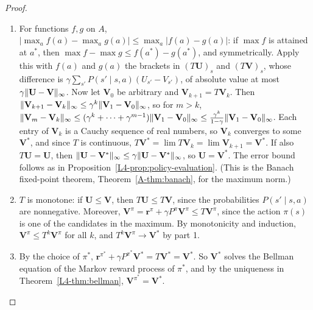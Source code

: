 \begin{proof}
    \begin{enumerate}
        \item For functions $f, g$ on $A$, $|\max_a f(a) - \max_a g(a)| \leq \max_a |f(a) - g(a)|$: if $\max f$ is attained at $a^*$, then $\max f - \max g \leq f(a^*) - g(a^*)$, and symmetrically. Apply this with $f(a)$ and $g(a)$ the brackets in $(T\mathbf{U})_s$ and $(T\mathbf{V})_s$, whose difference is $\gamma\sum_{s'}P(s' \mid s, a)(U_{s'} - V_{s'})$, of absolute value at most $\gamma\lVert \mathbf{U} - \mathbf{V} \rVert_\infty$. Now let $\mathbf{V}_0$ be arbitrary and $\mathbf{V}_{k+1} = T\mathbf{V}_k$. Then $\lVert \mathbf{V}_{k+1} - \mathbf{V}_k \rVert_\infty \leq \gamma^k\lVert \mathbf{V}_1 - \mathbf{V}_0 \rVert_\infty$, so for $m > k$, $\lVert \mathbf{V}_m - \mathbf{V}_k \rVert_\infty \leq (\gamma^k + \cdots + \gamma^{m-1})\lVert \mathbf{V}_1 - \mathbf{V}_0 \rVert_\infty \leq \frac{\gamma^k}{1 - \gamma}\lVert \mathbf{V}_1 - \mathbf{V}_0 \rVert_\infty$. Each entry of $\mathbf{V}_k$ is a Cauchy sequence of real numbers, so $\mathbf{V}_k$ converges to some $\mathbf{V}^*$, and since $T$ is continuous, $T\mathbf{V}^* = \lim T\mathbf{V}_k = \lim\mathbf{V}_{k+1} = \mathbf{V}^*$. If also $T\mathbf{U} = \mathbf{U}$, then $\lVert \mathbf{U} - \mathbf{V}^* \rVert_\infty \leq \gamma\lVert \mathbf{U} - \mathbf{V}^* \rVert_\infty$, so $\mathbf{U} = \mathbf{V}^*$. The error bound follows as in Proposition~\ref{L4-prop:policy-evaluation}. (This is the Banach fixed-point theorem, Theorem~\ref{A-thm:banach}, for the maximum norm.)
        \item $T$ is monotone: if $\mathbf{U} \leq \mathbf{V}$, then $T\mathbf{U} \leq T\mathbf{V}$, since the probabilities $P(s' \mid s, a)$ are nonnegative. Moreover, $\mathbf{V}^\pi = \mathbf{r}^\pi + \gamma P^\pi\mathbf{V}^\pi \leq T\mathbf{V}^\pi$, since the action $\pi(s)$ is one of the candidates in the maximum. By monotonicity and induction, $\mathbf{V}^\pi \leq T^k\mathbf{V}^\pi$ for all $k$, and $T^k\mathbf{V}^\pi \to \mathbf{V}^*$ by part 1.
        \item By the choice of $\pi^*$, $\mathbf{r}^{\pi^*} + \gamma P^{\pi^*}\mathbf{V}^* = T\mathbf{V}^* = \mathbf{V}^*$. So $\mathbf{V}^*$ solves the Bellman equation of the Markov reward process of $\pi^*$, and by the uniqueness in Theorem~\ref{L4-thm:bellman}, $\mathbf{V}^{\pi^*} = \mathbf{V}^*$. \qedhere
    \end{enumerate}
\end{proof}

